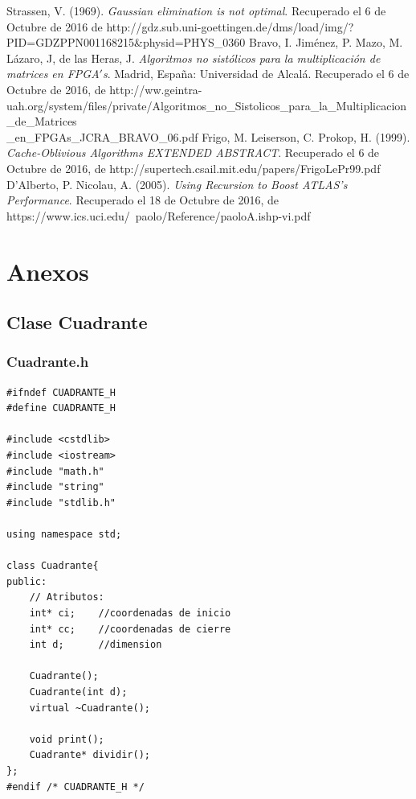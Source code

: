 \documentclass[12pt,letterpaper]{article}
\begin{document}
\begin{thebibliography}{1}
	Strassen, V. (1969). \textit{Gaussian elimination is not optimal}. Recuperado el 6 de Octubre de 2016 de http://gdz.sub.uni-goettingen.de/dms/load/img/?
PID=GDZPPN001168215\&physid=PHYS\_0360
    Bravo, I. Jiménez, P. Mazo, M. Lázaro, J, de las Heras, J. \textit{Algoritmos no sistólicos para la multiplicación de matrices en FPGA$'$s}. Madrid, España: Universidad de Alcalá. Recuperado el 6 de Octubre de 2016, de http://ww.geintra-uah.org/system/files/private/Algoritmos\_no\_Sistolicos\_para\_la\_Multiplicacion\_de\_Matrices\\\_en\_FPGAs\_JCRA\_BRAVO\_06.pdf
	Frigo, M. Leiserson, C. Prokop, H. (1999). \textit{Cache-Oblivious Algorithms EXTENDED ABSTRACT}. Recuperado el 6 de Octubre de 2016, de http://supertech.csail.mit.edu/papers/FrigoLePr99.pdf
     D’Alberto, P. Nicolau, A. (2005). \textit{Using Recursion to Boost ATLAS’s Performance}. Recuperado el 18 de Octubre de 2016, de https://www.ics.uci.edu/~paolo/Reference/paoloA.ishp-vi.pdf
\end{thebibliography}

\newpage

\section{Anexos}
\subsection{Clase Cuadrante}
\subsubsection*{Cuadrante.h}
\begin{lstlisting}
#ifndef CUADRANTE_H
#define CUADRANTE_H

#include <cstdlib>
#include <iostream>
#include "math.h"
#include "string"
#include "stdlib.h"

using namespace std;

class Cuadrante{
public:
	// Atributos:
	int* ci;	//coordenadas de inicio
	int* cc;	//coordenadas de cierre
	int d;		//dimension

	Cuadrante();	
	Cuadrante(int d);
	virtual ~Cuadrante();
	
	void print();
	Cuadrante* dividir();
};
#endif /* CUADRANTE_H */
\end{lstlisting}
\newpage
\end{document}
